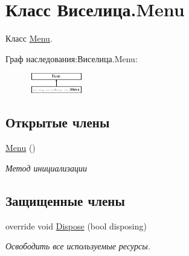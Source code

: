 \hypertarget{class_xD0_x92_xD0_xB8_xD1_x81_xD0_xB5_xD0_xBB_xD0_xB8_xD1_x86_xD0_xB0_1_1_menu}{\section{Класс Виселица.\+Menu}
\label{class_xD0_x92_xD0_xB8_xD1_x81_xD0_xB5_xD0_xBB_xD0_xB8_xD1_x86_xD0_xB0_1_1_menu}
}


Класс \hyperlink{class_xD0_x92_xD0_xB8_xD1_x81_xD0_xB5_xD0_xBB_xD0_xB8_xD1_x86_xD0_xB0_1_1_menu}{Menu}.  


Граф наследования\+:Виселица.\+Menu\+:\begin{figure}[H]
\begin{center}
\leavevmode
\includegraphics[height=0.877056cm]{class_xD0_x92_xD0_xB8_xD1_x81_xD0_xB5_xD0_xBB_xD0_xB8_xD1_x86_xD0_xB0_1_1_menu}
\end{center}
\end{figure}
\subsection*{Открытые члены}
\begin{DoxyCompactItemize}
\item 
\hyperlink{class_xD0_x92_xD0_xB8_xD1_x81_xD0_xB5_xD0_xBB_xD0_xB8_xD1_x86_xD0_xB0_1_1_menu_aa873418930f87a61579c8f249f5e6b61}{Menu} ()
\begin{DoxyCompactList}\small\item\em Метод инициализации \end{DoxyCompactList}\end{DoxyCompactItemize}
\subsection*{Защищенные члены}
\begin{DoxyCompactItemize}
\item 
override void \hyperlink{class_xD0_x92_xD0_xB8_xD1_x81_xD0_xB5_xD0_xBB_xD0_xB8_xD1_x86_xD0_xB0_1_1_menu_a2cfce6cff9aa9ffeb76206de2bda9dea}{Dispose} (bool disposing)
\begin{DoxyCompactList}\small\item\em Освободить все используемые ресурсы. \end{DoxyCompactList}\end{DoxyCompactItemize}


